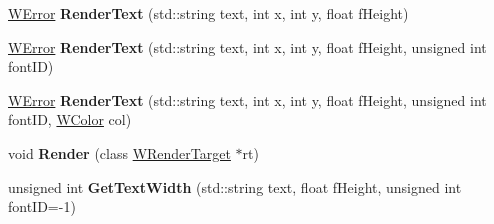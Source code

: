 \begin{DoxyCompactItemize}
\item 
\hyperlink{class_w_error}{W\+Error} {\bfseries Render\+Text} (std\+::string text, int x, int y, float f\+Height)\hypertarget{class_w_text_component_adbf4f965b141fc199541413e5700f657}{}\label{class_w_text_component_adbf4f965b141fc199541413e5700f657}

\item 
\hyperlink{class_w_error}{W\+Error} {\bfseries Render\+Text} (std\+::string text, int x, int y, float f\+Height, unsigned int font\+ID)\hypertarget{class_w_text_component_a7991923a70194f6f47f54c8e01a63222}{}\label{class_w_text_component_a7991923a70194f6f47f54c8e01a63222}

\item 
\hyperlink{class_w_error}{W\+Error} {\bfseries Render\+Text} (std\+::string text, int x, int y, float f\+Height, unsigned int font\+ID, \hyperlink{class_w_color}{W\+Color} col)\hypertarget{class_w_text_component_a0db38186ae9cbebe22df5e4d6bd2bff1}{}\label{class_w_text_component_a0db38186ae9cbebe22df5e4d6bd2bff1}

\item 
void {\bfseries Render} (class \hyperlink{class_w_render_target}{W\+Render\+Target} $\ast$rt)\hypertarget{class_w_text_component_a28969585d0835bb30103f8911d8586f0}{}\label{class_w_text_component_a28969585d0835bb30103f8911d8586f0}

\item 
unsigned int {\bfseries Get\+Text\+Width} (std\+::string text, float f\+Height, unsigned int font\+ID=-\/1)\hypertarget{class_w_text_component_a29cc611511111757f3392f4b3c83879a}{}\label{class_w_text_component_a29cc611511111757f3392f4b3c83879a}

\end{DoxyCompactItemize}
